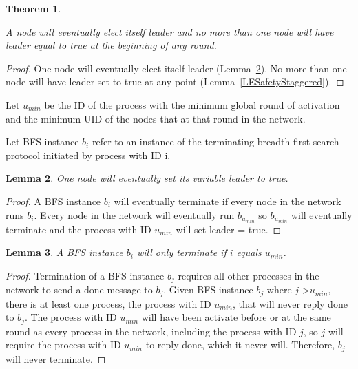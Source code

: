 \documentclass[english]{article}
\newtheorem{theorem}{Theorem}[section]
\newtheorem{lemma}[theorem]{Lemma}
\begin{document}
\begin{theorem}
\label{LeaderElectionStaggered}

A node will eventually elect itself leader and no more than one node will have leader equal to true at the beginning of any round. 
\end{theorem}
\begin{proof}
One node will eventually elect itself leader (Lemma~\ref{LELivenessStaggered}).
No more than one node will have leader set to true at any point (Lemma~\ref{LESafetyStaggered}).
\end{proof}

\begin{definition}
Let $u_{min}$ be the ID of the process with the minimum global round of activation and the minimum UID  of the nodes that at that round in the network. 
\end{definition}

\begin{definition}
Let BFS instance $b_i$ refer to an instance of the terminating breadth-first search protocol initiated by process with ID i.
\end{definition}


\begin{lemma}
\label{LELivenessStaggered}
  One node will eventually set its variable leader to true.
\end{lemma}
\begin{proof}
A BFS instance $b_i$ will eventually terminate if every node in the network runs $b_i$. 
Every node in the network will eventually run $b_{u_{min}}$ so $b_{u_{min}}$ will eventually terminate and the process with ID $u_{min}$ will set leader = true.
\end{proof}


\begin{lemma}
\label{BFSTerminationStaggered}
  A BFS instance $b_i$ will only terminate if $i$ equals $u_{min}$.
\end{lemma}
\begin{proof}
Termination of a BFS instance $b_j$ requires all other processes in the network to send a done message to $b_j$.
Given BFS instance $b_j$ where $j$ \textgreater $u_{min}$, there is at least one process, the process with ID $u_{min}$, that will never reply done to $b_j$. The process with ID $u_{min}$ will have been activate before or at the same round as every process in the network, including the process with ID $j$, so $j$ will require the process with ID $u_{min}$ to reply done, which it never will.
Therefore, $b_j$ will never terminate.
\end{proof}
\end{document}

